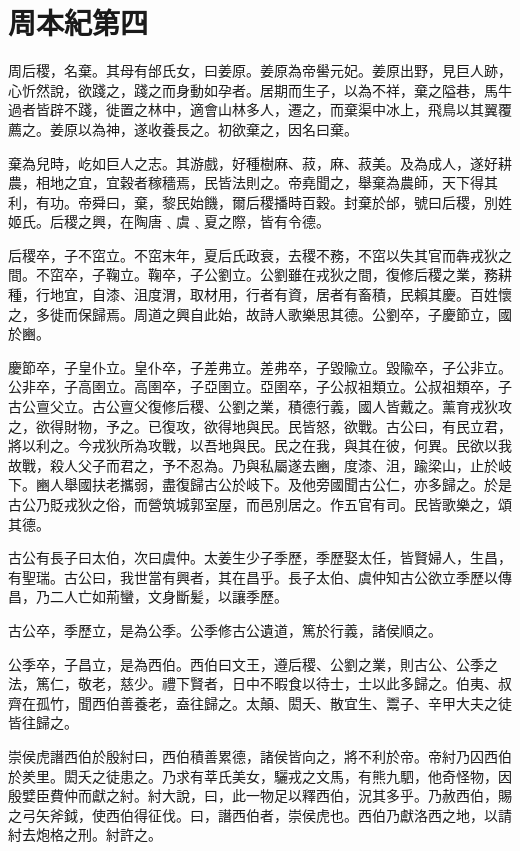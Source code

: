 \chapter{周本紀第四}

周后稷，名棄。其母有邰氏女，曰姜原。姜原為帝嚳元妃。姜原出野，見巨人跡，心忻然說，欲踐之，踐之而身動如孕者。居期而生子，以為不祥，棄之隘巷，馬牛過者皆辟不踐，徙置之林中，適會山林多人，遷之，而棄渠中冰上，飛鳥以其翼覆薦之。姜原以為神，遂收養長之。初欲棄之，因名曰棄。

棄為兒時，屹如巨人之志。其游戲，好種樹麻、菽，麻、菽美。及為成人，遂好耕農，相地之宜，宜穀者稼穡焉，民皆法則之。帝堯聞之，舉棄為農師，天下得其利，有功。帝舜曰，棄，黎民始饑，爾后稷播時百穀。封棄於邰，號曰后稷，別姓姬氏。后稷之興，在陶唐﹑虞﹑夏之際，皆有令德。

后稷卒，子不窋立。不窋末年，夏后氏政衰，去稷不務，不窋以失其官而犇戎狄之間。不窋卒，子鞠立。鞠卒，子公劉立。公劉雖在戎狄之間，復修后稷之業，務耕種，行地宜，自漆、沮度渭，取材用，行者有資，居者有畜積，民賴其慶。百姓懷之，多徙而保歸焉。周道之興自此始，故詩人歌樂思其德。公劉卒，子慶節立，國於豳。

慶節卒，子皇仆立。皇仆卒，子差弗立。差弗卒，子毀隃立。毀隃卒，子公非立。公非卒，子高圉立。高圉卒，子亞圉立。亞圉卒，子公叔祖類立。公叔祖類卒，子古公亶父立。古公亶父復修后稷、公劉之業，積德行義，國人皆戴之。薰育戎狄攻之，欲得財物，予之。已復攻，欲得地與民。民皆怒，欲戰。古公曰，有民立君，將以利之。今戎狄所為攻戰，以吾地與民。民之在我，與其在彼，何異。民欲以我故戰，殺人父子而君之，予不忍為。乃與私屬遂去豳，度漆、沮，踰梁山，止於岐下。豳人舉國扶老攜弱，盡復歸古公於岐下。及他旁國聞古公仁，亦多歸之。於是古公乃貶戎狄之俗，而營筑城郭室屋，而邑別居之。作五官有司。民皆歌樂之，頌其德。

古公有長子曰太伯，次曰虞仲。太姜生少子季歷，季歷娶太任，皆賢婦人，生昌，有聖瑞。古公曰，我世當有興者，其在昌乎。長子太伯、虞仲知古公欲立季歷以傳昌，乃二人亡如荊蠻，文身斷髪，以讓季歷。

古公卒，季歷立，是為公季。公季修古公遺道，篤於行義，諸侯順之。

公季卒，子昌立，是為西伯。西伯曰文王，遵后稷、公劉之業，則古公、公季之法，篤仁，敬老，慈少。禮下賢者，日中不暇食以待士，士以此多歸之。伯夷、叔齊在孤竹，聞西伯善養老，盍往歸之。太顛、閎夭、散宜生、鬻子、辛甲大夫之徒皆往歸之。

崇侯虎譖西伯於殷紂曰，西伯積善累德，諸侯皆向之，將不利於帝。帝紂乃囚西伯於羑里。閎夭之徒患之。乃求有莘氏美女，驪戎之文馬，有熊九駟，他奇怪物，因殷嬖臣費仲而獻之紂。紂大說，曰，此一物足以釋西伯，況其多乎。乃赦西伯，賜之弓矢斧鉞，使西伯得征伐。曰，譖西伯者，崇侯虎也。西伯乃獻洛西之地，以請紂去炮格之刑。紂許之。

